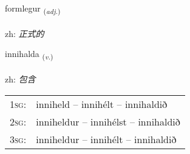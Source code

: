 \documentclass[frontgrid, backgrid]{flacards}\usepackage[]{graphicx}\usepackage[]{color}
\begin{document}
\renewcommand{\flhead}{\vskip5pt \fboxsep=0pt {\small\bfseries\footnotesize Lýsingarorð | 形容词}}
\renewcommand{\fcfoot}{\vskip5pt \fboxsep=0pt \hspace{2pt}{\small\bfseries\footnotesize 2K}}

\renewcommand{\blhead}{\vskip5pt {\small\bfseries\footnotesize Lýsingarorð | 形容词 }}
\renewcommand{\bcfoot}{\vskip5pt \hspace{2pt}{\small\bfseries\footnotesize 2K}}


{formlegur \small{\textsubscript{(\textit{adj.})}} \\[1ex] %
\textphonetic{[fɔrmlɛɣʏr]} \\
zh: \emph{正式的} \\  [2ex]
\renewcommand*{\arraystretch}{0.8}
}

\renewcommand{\flhead}{\vskip5pt \fboxsep=0pt {\small\bfseries\footnotesize Sagnorð | 动词}}
\renewcommand{\fcfoot}{\vskip5pt \fboxsep=0pt \hspace{2pt}{\small\bfseries\footnotesize 2K}}

\renewcommand{\blhead}{\vskip5pt {\small\bfseries\footnotesize Sagnorð | 动词 }}
\renewcommand{\bcfoot}{\vskip5pt \hspace{2pt}{\small\bfseries\footnotesize 2K}}


{innihalda \small{\textsubscript{(\textit{v.})}} \\[1ex] %
\textphonetic{[ɪnɪhalta]} \\
zh: \emph{包含} \\  [2ex]
\renewcommand*{\arraystretch}{0.8}
\begin{tabular}{p{1cm}l}
\textsc{1sg}: & inniheld -- innihélt -- innihaldið \\ 
\textsc{2sg}: & inniheldur -- innihélst -- innihaldið \\ 
\textsc{3sg}: & inniheldur -- innihélt -- innihaldið \\ 
\end{tabular}
}
\end{document}
